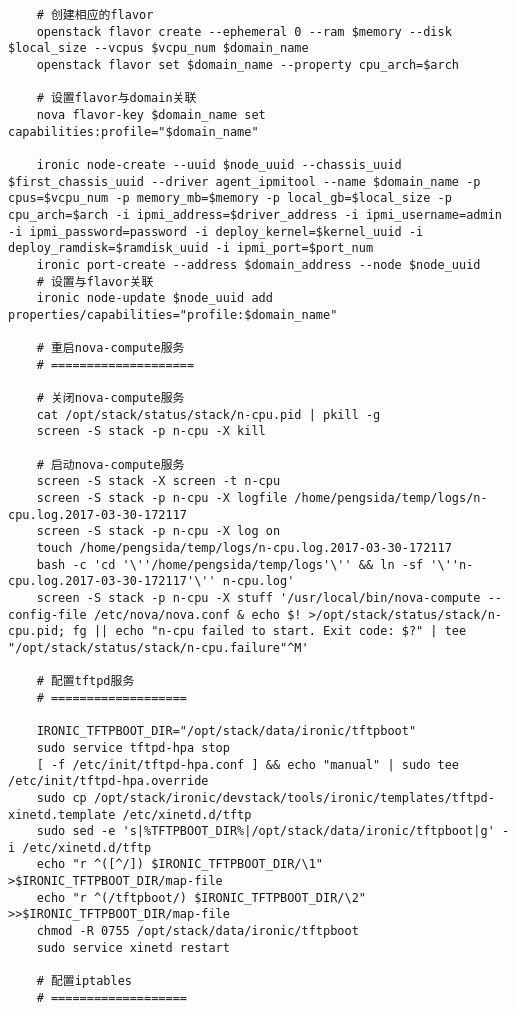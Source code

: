 \documentclass[a4paper,left=1.5cm,right=1.5cm,11pt]{article}
\begin{document}
\begin{lstlisting}
	# 创建相应的flavor
	openstack flavor create --ephemeral 0 --ram $memory --disk $local_size --vcpus $vcpu_num $domain_name
	openstack flavor set $domain_name --property cpu_arch=$arch

	# 设置flavor与domain关联
	nova flavor-key $domain_name set capabilities:profile="$domain_name"

	ironic node-create --uuid $node_uuid --chassis_uuid $first_chassis_uuid --driver agent_ipmitool --name $domain_name -p cpus=$vcpu_num -p memory_mb=$memory -p local_gb=$local_size -p cpu_arch=$arch -i ipmi_address=$driver_address -i ipmi_username=admin -i ipmi_password=password -i deploy_kernel=$kernel_uuid -i deploy_ramdisk=$ramdisk_uuid -i ipmi_port=$port_num
	ironic port-create --address $domain_address --node $node_uuid
	# 设置与flavor关联
	ironic node-update $node_uuid add properties/capabilities="profile:$domain_name"

	# 重启nova-compute服务
	# ====================

	# 关闭nova-compute服务
	cat /opt/stack/status/stack/n-cpu.pid | pkill -g
	screen -S stack -p n-cpu -X kill

	# 启动nova-compute服务
	screen -S stack -X screen -t n-cpu
	screen -S stack -p n-cpu -X logfile /home/pengsida/temp/logs/n-cpu.log.2017-03-30-172117
    screen -S stack -p n-cpu -X log on
	touch /home/pengsida/temp/logs/n-cpu.log.2017-03-30-172117
    bash -c 'cd '\''/home/pengsida/temp/logs'\'' && ln -sf '\''n-cpu.log.2017-03-30-172117'\'' n-cpu.log'
	screen -S stack -p n-cpu -X stuff '/usr/local/bin/nova-compute --config-file /etc/nova/nova.conf & echo $! >/opt/stack/status/stack/n-cpu.pid; fg || echo "n-cpu failed to start. Exit code: $?" | tee "/opt/stack/status/stack/n-cpu.failure"^M'

	# 配置tftpd服务
	# ===================

	IRONIC_TFTPBOOT_DIR="/opt/stack/data/ironic/tftpboot"
	sudo service tftpd-hpa stop
	[ -f /etc/init/tftpd-hpa.conf ] && echo "manual" | sudo tee /etc/init/tftpd-hpa.override
	sudo cp /opt/stack/ironic/devstack/tools/ironic/templates/tftpd-xinetd.template /etc/xinetd.d/tftp
	sudo sed -e 's|%TFTPBOOT_DIR%|/opt/stack/data/ironic/tftpboot|g' -i /etc/xinetd.d/tftp
	echo "r ^([^/]) $IRONIC_TFTPBOOT_DIR/\1" >$IRONIC_TFTPBOOT_DIR/map-file
	echo "r ^(/tftpboot/) $IRONIC_TFTPBOOT_DIR/\2" >>$IRONIC_TFTPBOOT_DIR/map-file
	chmod -R 0755 /opt/stack/data/ironic/tftpboot
	sudo service xinetd restart

	# 配置iptables
	# ===================


\end{lstlisting}
\end{document}
